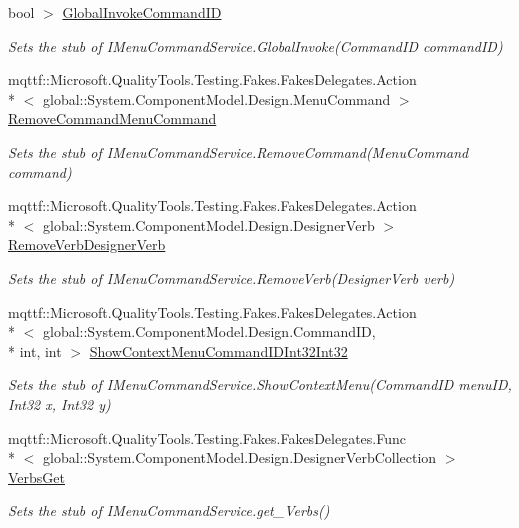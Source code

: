 \begin{DoxyCompactItemize}
bool $>$ \hyperlink{class_system_1_1_component_model_1_1_design_1_1_fakes_1_1_stub_i_menu_command_service_ad835fba4db623a6abdc626cdbdb12b53}{Global\-Invoke\-Command\-I\-D}
\begin{DoxyCompactList}\small\item\em Sets the stub of I\-Menu\-Command\-Service.\-Global\-Invoke(\-Command\-I\-D command\-I\-D)\end{DoxyCompactList}\item 
mqttf\-::\-Microsoft.\-Quality\-Tools.\-Testing.\-Fakes.\-Fakes\-Delegates.\-Action\\*
$<$ global\-::\-System.\-Component\-Model.\-Design.\-Menu\-Command $>$ \hyperlink{class_system_1_1_component_model_1_1_design_1_1_fakes_1_1_stub_i_menu_command_service_aa85fff747480603b1dd0b36a46ff1eb7}{Remove\-Command\-Menu\-Command}
\begin{DoxyCompactList}\small\item\em Sets the stub of I\-Menu\-Command\-Service.\-Remove\-Command(\-Menu\-Command command)\end{DoxyCompactList}\item 
mqttf\-::\-Microsoft.\-Quality\-Tools.\-Testing.\-Fakes.\-Fakes\-Delegates.\-Action\\*
$<$ global\-::\-System.\-Component\-Model.\-Design.\-Designer\-Verb $>$ \hyperlink{class_system_1_1_component_model_1_1_design_1_1_fakes_1_1_stub_i_menu_command_service_ac47d766ba122d74ab7aaca3589ba2ee7}{Remove\-Verb\-Designer\-Verb}
\begin{DoxyCompactList}\small\item\em Sets the stub of I\-Menu\-Command\-Service.\-Remove\-Verb(\-Designer\-Verb verb)\end{DoxyCompactList}\item 
mqttf\-::\-Microsoft.\-Quality\-Tools.\-Testing.\-Fakes.\-Fakes\-Delegates.\-Action\\*
$<$ global\-::\-System.\-Component\-Model.\-Design.\-Command\-I\-D, \\*
int, int $>$ \hyperlink{class_system_1_1_component_model_1_1_design_1_1_fakes_1_1_stub_i_menu_command_service_a0d82df71b1fd03395ad327988f1ecf82}{Show\-Context\-Menu\-Command\-I\-D\-Int32\-Int32}
\begin{DoxyCompactList}\small\item\em Sets the stub of I\-Menu\-Command\-Service.\-Show\-Context\-Menu(\-Command\-I\-D menu\-I\-D, Int32 x, Int32 y)\end{DoxyCompactList}\item 
mqttf\-::\-Microsoft.\-Quality\-Tools.\-Testing.\-Fakes.\-Fakes\-Delegates.\-Func\\*
$<$ global\-::\-System.\-Component\-Model.\-Design.\-Designer\-Verb\-Collection $>$ \hyperlink{class_system_1_1_component_model_1_1_design_1_1_fakes_1_1_stub_i_menu_command_service_a6c2ce2e613039494514cb935ee42f5dd}{Verbs\-Get}
\begin{DoxyCompactList}\small\item\em Sets the stub of I\-Menu\-Command\-Service.\-get\-\_\-\-Verbs()\end{DoxyCompactList}\end{DoxyCompactItemize}


